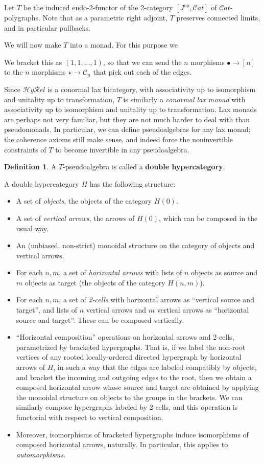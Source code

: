 \documentclass{article}
\theoremstyle{definition}
\newtheorem{defn}[thm]{Definition}
\theoremstyle{remark}
\def\C{\mathcal{C}}
\def\Cat{\ensuremath{\mathcal{C}\mathit{at}}}
\def\cpg{\ensuremath{\mathcal{CPG}}\xspace}
\def\op{^{\mathrm{op}}}
\def\hyrel{\mathcal{H}\mathit{y}\mathcal{R}\mathit{el}}
\begin{document}
Let $T$ be the induced endo-2-functor of the 2-category $[J\op,\Cat]$ of \Cat-polygraphs. %
Note that as a parametric right adjoint, $T$ preserves connected limits, and in particular pullbacks.

We will now make $T$ into a monad.
For this purpose we 

We bracket this as $(1,1,\dots,1)$, so that we can send the $n$ morphisms $\bullet \to [n]$ to the $n$ morphisms $\star\to \C_n$ that pick out each of the edges.



Since $\hyrel$ is a conormal lax bicategory, with associativity up to isomorphism and unitality up to transformation, $T$ is similarly a \emph{conormal lax monad} with associativity up to isomorphism and unitality up to transformation.
Lax monads are perhaps not very familiar, but they are not much harder to deal with than pseudomonads.
In particular, we can define pseudoalgebras for any lax monad; the coherence axioms still make sense, and indeed force the noninvertible constraints of $T$ to become invertible in any pseudoalgebra.

\begin{defn}
  A $T$-pseudoalgebra is called a \textbf{double hypercategory}.
\end{defn}

A double hypercategory $H$ has the following structure:
\begin{itemize}
\item A set of \emph{objects}, the objects of the category $H(0)$.
\item A set of \emph{vertical arrows}, the arrows of $H(0)$, which can be composed in the usual way.
\item An (unbiased, non-strict) monoidal structure on the category of objects and vertical arrows.
\item For each $n,m$, a set of \emph{horizontal arrows} with lists of $n$ objects as source and $m$ objects as target (the objects of the category $H(n,m)$).
\item For each $n,m$, a set of \emph{2-cells} with horizontal arrows as ``vertical source and target'', and lists of $n$ vertical arrows and $m$ vertical arrows as ``horizontal source and target''.
  These can be composed vertically.
\item ``Horizontal composition'' operations on horizontal arrows and 2-cells, parametrized by bracketed hypergraphs.
  That is, if we label the non-root vertices of any rooted locally-ordered directed hypergraph by horizontal arrows of $H$, in such a way that the edges are labeled compatibly by objects, and bracket the incoming and outgoing edges to the root, then we obtain a composed horizontal arrow whose source and target are obtained by applying the monoidal structure on objects to the groups in the brackets.
  We can similarly compose hypergraphs labeled by 2-cells, and this operation is functorial with respect to vertical composition.
\item Moreover, isomorphisms of bracketed hypergraphs induce isomorphisms of composed horizontal arrows, naturally.
  In particular, this applies to \emph{automorphisms}.
\end{itemize}
\end{document}
